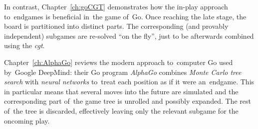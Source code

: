In contrast, Chapter~\ref{ch:goCGT} demonstrates how the in-play approach to~endgames is beneficial in~the game of~Go.
Once reaching the late stage, the board is partitioned into distinct parts.
The corresponding (and provably independent) subgames are re-solved ``on the fly'', just to be afterwards combined using the \emph{\acrlong{cgt}}.

Chapter~\ref{ch:AlphaGo} reviews the modern approach to~computer Go used by~Google DeepMind:
their Go program \emph{AlphaGo} combines \emph{Monte Carlo tree search} with \emph{neural networks} to~treat each position as if it were an~endgame.
This in particular means that several moves into the future are simulated and the corresponding part of~the game tree is unrolled and possibly expanded.
The rest of~the tree is discarded, effectively leaving only the relevant subgame for the oncoming play.
